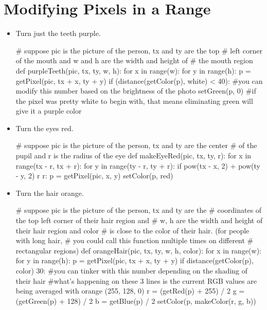 
\chapter{Modifying Pixels in a Range}

\begin{exercises}

\begin{ex}

\begin{itemize}

\item Turn just the teeth purple.
\begin{example}
# suppose pic is the picture of the person, tx and ty are the top
# left corner of the mouth and w and h are the width and height of
# the mouth region
def purpleTeeth(pic, tx, ty, w, h):
  for x in range(w):
    for y in range(h):
      p = getPixel(pic, tx + x, ty + y)
      if (distance(getColor(p), white) < 40): #you can modify this number
based on the brightness of the photo
        setGreen(p, 0) #if the pixel was pretty white to begin with, that
means eliminating green will give it a purple color
\end{example}

\item Turn the eyes red.
\begin{example}
# suppose pic is the picture of the person, tx and ty are the center
# of the pupil and r is the radius of the eye
def makeEyeRed(pic, tx, ty, r):
  for x in range(tx - r, tx + r):
    for y in range(ty - r, ty + r):
      if pow(tx - x, 2) + pow(ty - y, 2) r r:
        p = getPixel(pic, x, y)
        setColor(p, red)
\end{example}

\item Turn the hair orange.
\begin{example}
# suppose pic is the picture of the person, tx and ty are the
# coordinates of the top left corner of their hair region and
# w, h are the width and height of their hair region and color
# is close to the color of their hair. (for people with long hair,
# you could call this function multiple times on different
# rectangular regions)
def orangeHair(pic, tx, ty, w, h, color):
  for x in range(w):
    for y in range(h):
      p = getPixel(pic, tx + x, ty + y)
      if distance(getColor(p), color) 30: #you can tinker with this number depending on the shading of their hair
        #what's happening on these 3 lines is the current RGB values are being averaged with orange (255, 128, 0)
        r = (getRed(p) + 255) / 2
        g = (getGreen(p) + 128) / 2
        b = getBlue(p) / 2
        setColor(p, makeColor(r, g, b))
\end{example}


\end{itemize}
\end{ex}
\end{exercises}

